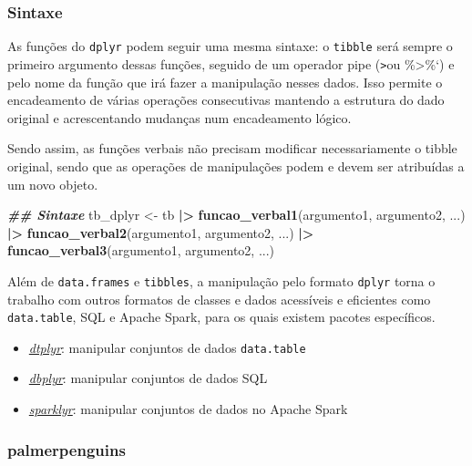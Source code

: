 \documentclass[
]{article}
\newenvironment{Shaded}{\begin{snugshade}}{\end{snugshade}}
\newcommand{\DocumentationTok}[1]{\textcolor[rgb]{0.56,0.35,0.01}{\textbf{\textit{#1}}}}
\newcommand{\FunctionTok}[1]{\textcolor[rgb]{0.13,0.29,0.53}{\textbf{#1}}}
\newcommand{\NormalTok}[1]{#1}
\newcommand{\OtherTok}[1]{\textcolor[rgb]{0.56,0.35,0.01}{#1}}
\newcommand{\SpecialCharTok}[1]{\textcolor[rgb]{0.81,0.36,0.00}{\textbf{#1}}}
\providecommand{\tightlist}{%
  \setlength{\itemsep}{0pt}\setlength{\parskip}{0pt}}
\begin{document}
\hypertarget{sintaxe}{%
\subsubsection{Sintaxe}\label{sintaxe}}

As funções do \texttt{dplyr} podem seguir uma mesma sintaxe: o \texttt{tibble} será sempre o primeiro argumento dessas funções, seguido de um operador pipe (\texttt{\textbar{}\textgreater{}}ou \%\textgreater\%`) e pelo nome da função que irá fazer a manipulação nesses dados. Isso permite o encadeamento de várias operações consecutivas mantendo a estrutura do dado original e acrescentando mudanças num encadeamento lógico.

Sendo assim, as funções verbais não precisam modificar necessariamente o tibble original, sendo que as operações de manipulações podem e devem ser atribuídas a um novo objeto.

\begin{Shaded}
\begin{Highlighting}[]
\DocumentationTok{\#\# Sintaxe}
\NormalTok{tb\_dplyr }\OtherTok{\textless{}{-}}\NormalTok{ tb }\SpecialCharTok{|\textgreater{}} 
    \FunctionTok{funcao\_verbal1}\NormalTok{(argumento1, argumento2, ...) }\SpecialCharTok{|\textgreater{}} 
    \FunctionTok{funcao\_verbal2}\NormalTok{(argumento1, argumento2, ...) }\SpecialCharTok{|\textgreater{}} 
    \FunctionTok{funcao\_verbal3}\NormalTok{(argumento1, argumento2, ...)}
\end{Highlighting}
\end{Shaded}

Além de \texttt{data.frames} e \texttt{tibbles}, a manipulação pelo formato \texttt{dplyr} torna o trabalho com outros formatos de classes e dados acessíveis e eficientes como \texttt{data.table}, SQL e Apache Spark, para os quais existem pacotes específicos.

\begin{itemize}
\tightlist
\item
  \href{https://dtplyr.tidyverse.org/}{\emph{dtplyr}}: manipular conjuntos de dados \texttt{data.table}
\item
  \href{https://dbplyr.tidyverse.org/}{\emph{dbplyr}}: manipular conjuntos de dados SQL
\item
  \href{https://spark.rstudio.com/}{\emph{sparklyr}}: manipular conjuntos de dados no Apache Spark
\end{itemize}

\hypertarget{palmerpenguins-1}{%
\subsubsection{palmerpenguins}\label{palmerpenguins-1}}
\end{document}

